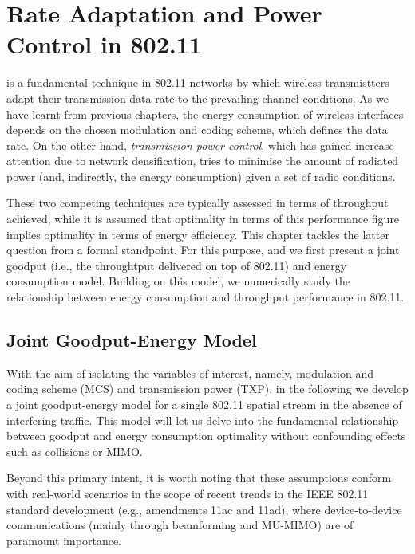 \documentclass[twoside,nohyper]{tufte-book}
\theoremstyle{definition}
\theoremstyle{definition}
\theoremstyle{definition}
\theoremstyle{remark}
\begin{document}
\hypertarget{ch:06}{%
\chapter{Rate Adaptation and Power Control in 802.11}\label{ch:06}}

 is a fundamental technique in 802.11
networks by which wireless transmistters adapt their transmission data
rate to the prevailing channel conditions. As we have learnt from
previous chapters, the energy consumption of wireless interfaces depends
on the chosen modulation and coding scheme, which defines the data rate.
On the other hand, \emph{transmission power control}, which has gained
increase attention due to network densification, tries to minimise the
amount of radiated power (and, indirectly, the energy consumption) given
a set of radio conditions.

These two competing techniques are typically assessed in terms of
throughput achieved, while it is assumed that optimality in terms of
this performance figure implies optimality in terms of energy
efficiency. This chapter tackles the latter question from a formal
standpoint. For this purpose, and we first present a joint goodput
(i.e., the throughtput delivered on top of 802.11) and energy
consumption model. Building on this model, we numerically study the
relationship between energy consumption and throughput performance in
802.11.

\hypertarget{joint-goodput-energy-model}{%
\section{Joint Goodput-Energy Model}\label{joint-goodput-energy-model}}

With the aim of isolating the variables of interest, namely, modulation
and coding scheme (MCS) and transmission power (TXP), in the following
we develop a joint goodput-energy model for a single 802.11 spatial
stream in the absence of interfering traffic. This model will let us
delve into the fundamental relationship between goodput and energy
consumption optimality without confounding effects such as collisions or
MIMO.

Beyond this primary intent, it is worth noting that these assumptions
conform with real-world scenarios in the scope of recent trends in the
IEEE 802.11 standard development (e.g., amendments 11ac and 11ad), where
device-to-device communications (mainly through beamforming and MU-MIMO)
are of paramount importance.
\end{document}
